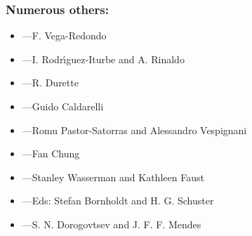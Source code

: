 
\begin{frame}
  \frametitle{Numerous others:}
  
  \small
  
    \begin{itemize}
    \item 
      ---F. Vega-Redondo\cite{vega-redondo2007a}
    \item 
      ---I. Rodr\'{\i}guez-Iturbe and A. Rinaldo\cite{rodriguez-iturbe1997a}
    \item 
      ---R. Durette
    \item 
      ---Guido Caldarelli
    \item 
      ---Romu Pastor-Satorras and Alessandro Vespignani
    \item 
      ---Fan Chung
    \item 
      ---Stanley Wasserman and Kathleen Faust
    \item 
      ---Eds: Stefan Bornholdt and H. G. Schuster\cite{bornholdt2003a}
    \item 
      ---S. N. Dorogovtsev and J. F. F. Mendes\cite{dorogovtsev2003a}
    \end{itemize}

\end{frame}



